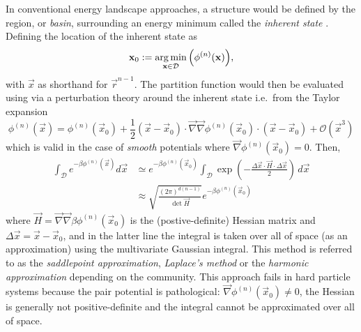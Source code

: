 \documentclass[11pt,twoside]{report}
\begin{document}
In conventional energy landscape approaches, a structure%
would be defined by the region, or \emph{basin}, surrounding an energy minimum called the \emph{inherent state} \cite{StillingerPRA1982,StillingerS1995,Wales2004}.
Defining the location of the inherent state as
\begin{equation*}
  \boldsymbol{\mathbf{x}}_0
  :=
  \operatorname*{arg\,min}_{\boldsymbol{\mathbf{x}} \in \mathcal{D}}{\left( \phi^{(n)}(\boldsymbol{\mathbf{x}}) \right)},
\end{equation*}
with $\vec{x}$ as shorthand for $\vec{r}^{n-1}$.
The partition function would then be evaluated using via a perturbation theory around the inherent state i.e.\ from the Taylor expansion \cite{Wales2004}
\begin{equation*}
  \phi^{(n)}(\vec{x})
  =
  \phi^{(n)}(\vec{x}_0)
  + \frac{1}{2} (\vec{x} - \vec{x}_0) \cdot
  \vec{\nabla}\vec{\nabla} \phi^{(n)}(\vec{x}_0)
  \cdot (\vec{x} - \vec{x}_0)
  + \mathcal{O}(\vec{x}^3)
\end{equation*}
which is valid in the case of \emph{smooth} potentials where $\vec{\nabla} \phi^{(n)}(\vec{x}_0) = 0$.
Then, \cite{Wales2004}
\begin{equation*}
  \begin{split}
    \int_\mathcal{D} e^{-\beta\phi^{(n)}(\vec{x})} d\vec{x}
    &\simeq
    e^{-\beta\phi^{(n)}(\vec{x}_0)}
    \int_\mathcal{D}
    \exp{\left( - \frac{\Delta\vec{x} \cdot \vec{H} \cdot \Delta\vec{x}}{2} \right)}
    \, d\vec{x}
    \\ &\approx
    \sqrt{ \frac{(2\pi)^{d(n-1)}}{\det \vec{H}} }
    e^{-\beta\phi^{(n)}(\vec{x}_0)}
  \end{split}
\end{equation*}
where $\vec{H} = \vec{\nabla}\vec{\nabla} \beta \phi^{(n)}(\vec{x}_0)$ is the (postive-definite) Hessian matrix and $\Delta \vec{x} = \vec{x} - \vec{x}_0$, and in the latter line the integral is taken over all of space (as an approximation) using the multivariate Gaussian integral.
This method is referred to as the \emph{saddlepoint approximation}, \emph{Laplace's method} or the \emph{harmonic approximation} depending on the community.
This approach fails in hard particle systems because the pair potential is pathological: $\vec{\nabla} \phi^{(n)}(\vec{x}_0) \ne 0$, the Hessian is generally not positive-definite and the integral cannot be approximated over all of space.
\end{document}

